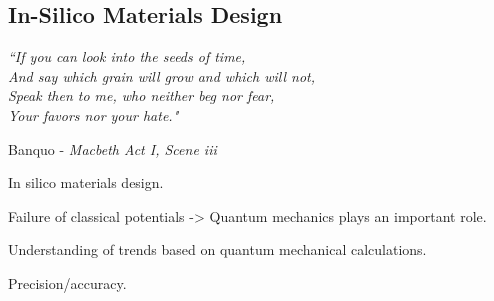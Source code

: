 \begin{refsection} 
 
\chapter{In-Silico Materials Design} 
 
\setlength{\epigraphwidth}{4in} 
\epigraph{\textit{``If you can look into the seeds of time, \\And say which 
grain will grow and which will not,\\Speak then to me, who neither beg nor 
fear,\\Your favors nor your hate."}}{Banquo - \textit{Macbeth Act I, Scene 
iii}} 
\vspace{3em} 
 
In silico materials design. 
 
Failure of classical potentials -> Quantum mechanics plays an important role. 
 
Understanding of trends based on quantum mechanical calculations. 
 
Precision/accuracy. 
 
\printbibliography 
\end{refsection} 